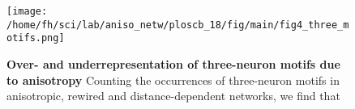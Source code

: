 \begin{figure}[h]

\centering

\texttt{[image: /home/fh/sci/lab/aniso\_netw/ploscb\_18/fig/main/fig4\_three\_motifs.png]}

\caption{{\bf Over- and underrepresentation of three-neuron motifs due
  to anisotropy}
  Counting the occurrences of three-neuron motifs in anisotropic,
  rewired and distance-dependent networks, we find that }
\label{fig_three-neuron}%
\end{figure}
